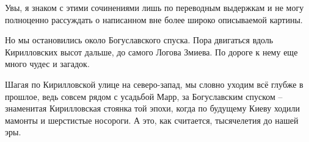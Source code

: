 Увы, я знаком с этими сочинениями лишь по переводным выдержкам и не могу полноценно рассуждать о написанном вне более широко описываемой картины.

Но мы остановились около Богуславского спуска. Пора двигаться вдоль Кирилловских высот дальше, до самого Логова Змиева. По дороге к нему еще много чудес и загадок.

Шагая по Кирилловской улице на северо-запад, мы словно уходим всё глубже в прошлое, ведь совсем рядом с усадьбой Марр, за Богуславским спуском – знаменитая Кирилловская стоянка той эпохи, когда по будущему Киеву ходили мамонты и шерстистые носороги. А это, как считается, тысячелетия до нашей эры.
